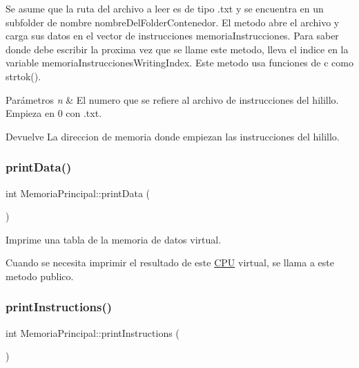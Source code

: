 Se asume que la ruta del archivo a leer es de tipo {\ttfamily .txt} y se encuentra en un subfolder de nombre nombre\+Del\+Folder\+Contenedor. El metodo abre el archivo y carga sus datos en el vector de instrucciones memoria\+Instrucciones. Para saber donde debe escribir la proxima vez que se llame este metodo, lleva el indice en la variable memoria\+Instrucciones\+Writing\+Index. Este metodo usa funciones de c como strtok(). 
\begin{DoxyParams}{Parámetros}
{\em n} & El numero que se refiere al archivo de instrucciones del hilillo. Empieza en 0 con {.\+txt}. \\
\hline
\end{DoxyParams}
\begin{DoxyReturn}{Devuelve}
La direccion de memoria donde empiezan las instrucciones del hilillo. 
\end{DoxyReturn}
\mbox{\label{classMemoriaPrincipal_a0f07dc1a0723d5403a176f311a27ed1a}} 
\subsubsection{\texorpdfstring{print\+Data()}{printData()}}
{\footnotesize\ttfamily int Memoria\+Principal\+::print\+Data (\begin{DoxyParamCaption}{ }\end{DoxyParamCaption})}



Imprime una tabla de la memoria de datos virtual. 

Cuando se necesita imprimir el resultado de este \hyperlink{classCPU}{C\+PU} virtual, se llama a este metodo publico. \mbox{\label{classMemoriaPrincipal_ae7d66a00cbcbd3a51d99d1ec89bb26b5}} 
\subsubsection{\texorpdfstring{print\+Instructions()}{printInstructions()}}
{\footnotesize\ttfamily int Memoria\+Principal\+::print\+Instructions (\begin{DoxyParamCaption}{ }\end{DoxyParamCaption})}




